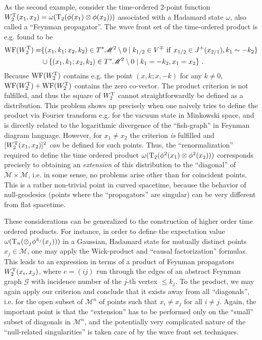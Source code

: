 \documentclass[12pt]{article}
\newcommand{\eG}{{\mathscr G}}
\newcommand{\M}{\mathscr{M}}
\newcommand{\T}{{\rm T}}
\DeclareMathOperator{\WF}{WF}
\theoremstyle{plain}
\theoremstyle{definition}
\def\ben{\begin{equation}}
\def\een{\end{equation}}
\begin{document}
As the second example, consider the  time-ordered 2-point function
$W_2^\T(x_1,x_2) = \omega(\T_2(\phi(x_1) \otimes \phi(x_2))) $
associated with a Hadamard state $\omega$, also called a ``Feynman propagator''.
The wave front set of the time-ordered product is e.g. found to be
\ben
\begin{split}
\WF(W_2^\T) =& \{ (x_1, k_1; x_2, k_2) \in T^* \M^2 \setminus 0 \mid k_{1/2} \in V^\mp \ {\rm if} \ x_{1/2} \in J^+(x_{2/1}), k_1 \sim -k_2 \} \\
&
\cup \{ (x_1,k_1; x_2,k_2) \in T^* \M^2 \setminus 0 \mid k_1 = - k_2, x_1 = x_2 \} \ .
\end{split}
\een
Because $\WF(W_2^\T)$ contains e.g. the point $(x,k;x,-k) $ for any $k \neq 0$, 
$\WF(W_2^\T) + \WF(W_2^\T)$ contains the zero co-vector. The product criterion is not 
fulfilled, and thus the square of $W_2^\T$ cannot straightforwardly be defined as a distribution. This problem shows up precisely when one naively tries to define
the product via Fourier transform e.g. for the vacuum state in Minkowski space,
and is directly related to the logarithmic divergence of the ``fish-graph'' in
Feynman diagram language. However, for $x_1 \neq x_2$ the criterion {\em is} fulfilled and
$[W_2^\T(x_1,x_2)]^2$ {\em can} be defined for such points. Thus, the ``renormalization'' required to define the time ordered product
$\omega(\T_2(\phi^2(x_1) \otimes \phi^2(x_2)))$ 
corresponds precisely to obtaining an {\em extension} of 
this distribution to the ``diagonal'' of $\M \times \M$, i.e.
in some sense, no problems arise other than for coincident points. This is a rather 
non-trivial point in curved spacetime, because the behavior of null-geodesics (points
where the ``propagators'' are singular) can be very different from flat spacetime.  

These considerations can be generalized to the construction of higher 
order time ordered products. For instance, 
in order to define the expectation value $\omega(\T_n(\otimes_j \phi^{k_j}(x_j)))$ in a Gaussian, Hadamard state for mutually distinct points $x_j \in \M$, one may apply the 
Wick-product and ``causal factorization'' formulas. This leads to an expression in terms of
a product of Feynman propagators $W^\T_2(x_i, x_j)$, where $e=(ij)$ run through 
the edges of an abstract Feynman 
graph $\eG$ with incidence number of the $j$-th vertex $\le k_j$.
To the product, we may again apply our criterion and conclude that it exists 
away from all ``diagonals'', i.e. for the open subset of $\M^n$ of points such 
that $x_i \neq x_j$ for all $i \neq j$.  
Again, the important point is that the ``extension'' has to be performed only on 
the ``small'' subset of diagonals in $\M^n$, and the potentially very complicated nature of the ``null-related singularities'' is taken care of by the wave front set techniques. 
\end{document}
